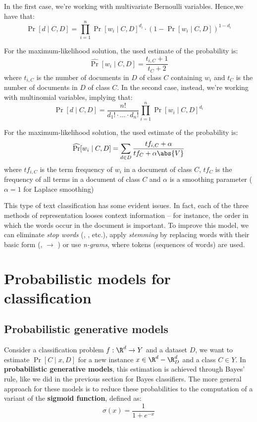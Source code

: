 \documentclass[a4paper, 12pt]{report}
\begin{document}
    In the first case, we're working with multivariate Bernoulli variables. Hence,we have that:
    \[\Pr[d \mid C, D] =  \prod_{i = 1}^n \Pr[w_i \mid C,D]^{d_i} \cdot (1 - \Pr[w_i \mid C, D])^{1-d_i}\]
    
    For the maximum-likelihood solution, the used estimate of the probability is:
    \[\widehat \Pr[w_i \mid C, D] = \frac{t_{i,C}+1}{t_C + 2}\]
    where $t_{i,C}$ is the number of documents in $D$ of class $C$ containing $w_i$ and $t_C$ is the number of documents in $D$ of class $C$. In the second case, instead, we're working with multinomial variables, implying that:
    \[\Pr[d \mid C, D] =  \frac{n!}{d_1! \cdot \ldots \cdot d_n!}\prod_{i = 1}^n \Pr[w_i \mid C, D]^{d_i}\]

    For the maximum-likelihood solution, the used estimate of the probability is:
    \[\widehat \Pr[w_i \mid C, D] = \sum_{d \in D} \frac{tf_{i,C} + \alpha}{tf_C + \alpha \abs{V}}\]
    where $tf_{i,C}$ is the term frequency of $w_i$ in a document of class $C$, $tf_{C}$ is the frequency of all terms in a document of class $C$ and $\alpha$ is a smoothing parameter ($\alpha = 1$ for Laplace smoothing)
    
    This type of text classification has some evident issues. In fact, each of the three methods of representation looses context information -- for instance, the order in which the words occur in the document is important. To improve this model, we can eliminate \textit{stop words} (, , etc.), apply \textit{stemming} by replacing words with their basic form (,  $\to$ ) or use \textit{n-grams}, where tokens (sequences of words) are used.

    \section{Probabilistic models for classification}

    \subsection{Probabilistic generative models}

    Consider a classification problem $f : \R^d \to Y$ and a dataset $D$, we want to estimate $\Pr[C \mid x, D]$ for a new instance $x \in \R^d-\R^d_D$ and a class $C \in Y$. In \textbf{probabilistic generative models}, this estimation is achieved through Bayes' rule, like we did in the previous section for Bayes classifiers. The more general approach for these models is to reduce these probabilities to the computation of a variant of the \textbf{sigmoid function}, defined as:
    \[\sigma(x) = \frac{1}{1+e^{-x}}\]
\end{document}
